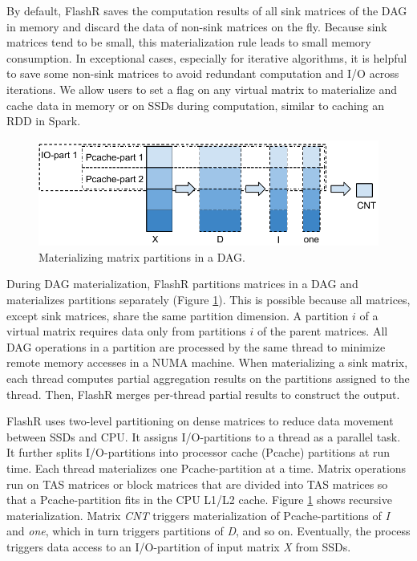 By default,
FlashR saves the computation results of all sink matrices of
the DAG in memory and discard the data of non-sink matrices on the fly.
Because sink matrices tend to be small, this materialization
rule leads to small memory consumption.
In exceptional cases, especially for iterative algorithms,
it is helpful to save some non-sink matrices to avoid
redundant computation and I/O across iterations.  We allow users to
set a flag on any virtual matrix to materialize and cache data in memory
or on SSDs during computation, similar to caching an RDD in Spark.

\begin{figure}
	\centering
	\includegraphics[scale=0.6]{FlashMatrix_figs/materialize.pdf}
  \vspace{-4pt}
	\caption{Materializing matrix partitions in a DAG.}
	\label{fig:mater}
  \vspace{-8pt}
\end{figure}

During DAG materialization, FlashR partitions matrices in a DAG and
materializes partitions separately
(Figure \ref{fig:mater}). This is possible because all matrices, except
sink matrices, share the same partition dimension. 
A partition $i$ of a virtual matrix requires data only from partitions
$i$ of the parent matrices.  All DAG operations in a partition are processed by 
the same thread to minimize remote memory accesses in a NUMA machine.
When materializing a sink matrix, each thread computes partial
aggregation results on the partitions assigned to the thread. 
Then, FlashR merges per-thread partial results to construct the output.

FlashR uses two-level partitioning on dense matrices to reduce data
movement between SSDs and CPU. It assigns I/O-partitions to a thread as
a parallel task.
It further splits I/O-partitions into processor cache (Pcache)
partitions at run time.  Each thread materializes one Pcache-partition
at a time. Matrix operations run on TAS matrices or block matrices that are
divided into TAS matrices so that a Pcache-partition fits in the CPU L1/L2 cache.
Figure \ref{fig:mater} shows recursive materialization.
Matrix \textit{CNT} triggers materialization of
Pcache-partitions of \textit{I} and \textit{one}, which in turn triggers 
partitions of \textit{D}, and so on. Eventually, the process triggers data access
to an I/O-partition of input matrix \textit{X} from SSDs. 

